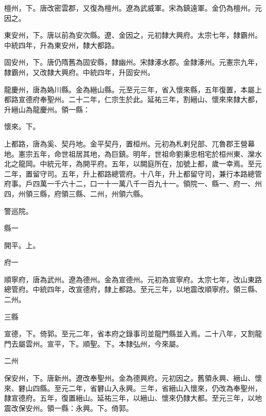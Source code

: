 \begin{pinyinscope}
 檀州，下。唐改密雲郡，又復為檀州。遼為武威軍。宋為鎮遠軍。金仍為檀州。元因之。



 東安州，下。唐以前為安次縣。遼、金因之，元初隸大興府。太宗七年，隸霸州。中統四年，升為東安州，隸大都路。



 固安州，下。唐仍隋舊為固安縣，隸幽州。宋隸涿水郡。金隸涿州。元憲宗九年，隸霸州，又改隸大興府。中統四年，升固安州。



 龍慶州，唐為媯川縣。金為縉山縣。元至元三年，省入懷來縣，五年復置，本屬上都路宣德府奉聖州。二十二年，仁宗生於此。延祐三年，割縉山、懷來來隸大都，升縉山為龍慶州。領一縣：



 懷來。下。



 上都路，唐為奚、契丹地。金平契丹，置桓州。元初為札剌兒部、兀魯郡王營幕地。憲宗五年，命世祖居其地，為巨鎮。明年，世祖命劉秉忠相宅於桓州東、灤水北之龍岡。中統元年，為開平府。五年，以闕庭所在，加號上都，歲一幸焉。至元二年，置留守司。五年，升上都路總管府。十八年，升上都留守司，兼行本路總管府事。戶四萬一千六十二，口一十一萬八千一百九十一。領院一、縣一、府一、州四，州領三縣，府領三縣、二州，州領六縣。



 警巡院。



 縣一



 開平。上。



 府一



 順寧府，唐為武州。遼為德州。金為宣德州。元初為宣寧府。太宗七年，改山東路總管府。中統四年，改宣德府，隸上都路。至元三年，以地震改順寧府。領三縣、二州。



 三縣



 宣德，下。倚郭。至元二年，省本府之錄事司並龍門縣並入焉。二十八年，又割龍門去屬雲州。宣平，下。順聖。下。本隸弘州，今來屬。



 二州



 保安州，下。唐新州。遼改奉聖州。金為德興府。元初因之。舊領永興、縉山、懷來、礬山四縣。至元二年，省礬山入永興。三年，省縉山入懷來，仍改為奉聖州，隸宣德府。五年，復置縉山。延祐三年，以縉山、懷來仍隸大都。至元三年，以地震改保安州。領一縣：永興。下。倚郭。




\end{pinyinscope}
